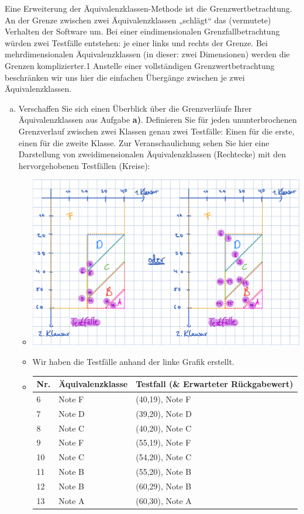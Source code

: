 Eine Erweiterung der Äquivalenzklassen-Methode ist die Grenzwertbetrachtung. An der Grenze zwischen zwei Äquivalenzklassen „schlägt“ das (vermutete) Verhalten der Software um. Bei einer eindimensionalen Grenzfallbetrachtung würden zwei Testfälle entstehen: je einer links und rechts der Grenze. Bei mehrdimensionalen Äquivalenzklassen (in dieser: zwei Dimensionen) werden die Grenzen komplizierter.1 Anstelle einer vollständigen Grenzwertbetrachtung beschränken wir uns hier die einfachen Übergänge zwischen je zwei Äquivalenzklassen.

\begin{enumerate}[c)]
    \item Verschaffen Sie sich einen Überblick über die Grenzverläufe Ihrer Äquivalenzklassen aus Aufgabe \textbf{a)}. Definieren Sie für jeden ununterbrochenen Grenzverlauf zwischen zwei Klassen genau zwei Testfälle: Einen für die erste, einen für die zweite Klasse. Zur Veranschaulichung sehen Sie hier eine Darstellung von zweidimensionalen Äquivalenzklassen (Rechtecke) mit den hervorgehobenen Testfällen (Kreise):
    \begin{itemize}
        \item[] \includegraphics[scale=0.4]{src/u11/garfik.png} 
        \item Wir haben die Testfälle anhand der linke Grafik erstellt.
        \item[] \begin{tabular}{|l|l|l|}
            \hline
            Nr. &  Äquivalenzklasse & Testfall (\& Erwarteter Rückgabewert)\\ \hline  
            6 & Note F & (40,19), Note F\\ \hline 
            7 & Note D & (39,20), Note D\\ \hline 
            8 & Note C & (40,20), Note C\\ \hline 
            9 & Note F & (55,19), Note F\\ \hline 
            10 & Note C & (54,20), Note C\\ \hline 
            11 & Note B & (55,20), Note B\\ \hline 
            12 & Note B & (60,29), Note B\\ \hline 
            13 & Note A & (60,30), Note A\\ \hline 
        \end{tabular}
    \end{itemize}


\end{enumerate}

